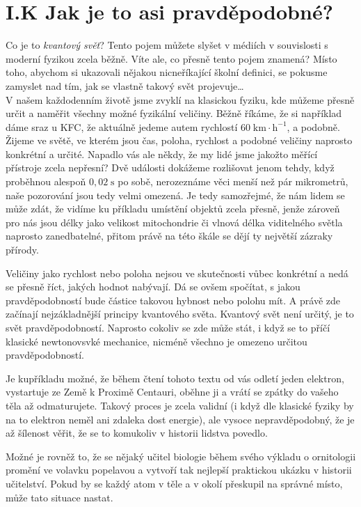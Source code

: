 \documentclass[crop=false]{standalone}
\begin{document}
\section*{I.K Jak je to asi pravděpodobné?}
\quad

Co je to \textit{kvantový svět}? Tento pojem můžete slyšet v médiích v souvislosti s moderní fyzikou zcela běžně. 
Víte ale, co přesně tento pojem znamená? Místo toho, abychom si ukazovali nějakou nicneříkající školní definici, 
se pokusme zamyslet nad tím, jak se vlastně takový svět projevuje\dots
\\

V našem každodenním životě jsme zvyklí na klasickou fyziku, kde můžeme přesně určit a naměřit všechny možné fyzikální veličiny. 
Běžně říkáme, že si například dáme sraz u KFC, že aktuálně jedeme autem rychlostí $60\;\mathrm{km\cdot h^{-1}}$, a podobně. 
Žijeme ve světě, ve kterém jsou čas, poloha, rychlost a podobné veličiny naprosto konkrétní a určité. Napadlo vás ale někdy, 
že my lidé jsme jakožto měřící přístroje zcela nepřesní? Dvě události dokážeme rozlišovat jenom tehdy, když proběhnou alespoň 
$0,02\;\mathrm{s}$ po sobě, nerozeznáme věci menší než pár mikrometrů, naše pozorování jsou tedy velmi omezená. Je tedy samozřejmé, 
že nám lidem se může zdát, že vidíme ku příkladu umístění objektů zcela přesně, jenže zároveň pro nás jsou délky jako velikost 
mitochondrie či vlnová délka viditelného světla naprosto zanedbatelné, přitom právě na této škále se dějí ty největší zázraky přírody.

Veličiny jako rychlost nebo poloha nejsou ve skutečnosti vůbec konkrétní a nedá se přesně říct, jakých hodnot nabývají. Dá se ovšem spočítat, s jakou 
pravděpodobností bude částice takovou hybnost nebo polohu mít. A právě zde začínají nejzákladnější principy kvantového světa. 
Kvantový svět není určitý, je to svět pravděpodobností. Naprosto cokoliv se zde může stát, i když se to příčí klasické newtonovsvké 
mechanice, nicméně všechno je omezeno určitou pravděpodobností.

Je kupříkladu možné, že během čtení tohoto textu od vás odletí jeden elektron, vystartuje ze Země k Proximě Centauri, oběhne ji a 
vrátí se zpátky do vašeho těla až odmaturujete. Takový proces je zcela validní (i když dle klasické fyziky by na to elektron neměl ani 
zdaleka dost energie), ale vysoce nepravděpodobný, že je až šílenost věřit, že se to komukoliv v historii lidstva povedlo.

Možné je rovněž to, že se nějaký učitel biologie během svého výkladu o ornitologii promění ve volavku popelavou a vytvoří tak 
nejlepší praktickou ukázku v historii učitelství. Pokud by se každý atom v těle a v okolí přeskupil na správné místo, může tato situace nastat.
\\
\end{document}
